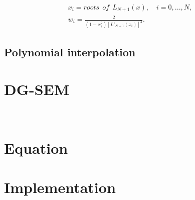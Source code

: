 \begin{gather}
	x_i = roots \:\: of \:\: L_{N + 1}(x), \quad i = 0, ..., N, \\
	w_i = \frac{2}{(1-x_i^2)\left [ L'_{N + 1}(x_i) \right ]^2}.
\end{gather}

\subsection{Polynomial interpolation} \label{section:spectral_element_method:spectral_approximation:polynomial_interpolation}

\section{DG-SEM} \label{section:spectral_element_method:dg_sem}

~\cite{Patera1984}

\section{Equation} \label{section:spectral_element_method:equation}

\section{Implementation} \label{section:spectral_element_method:implementation}
